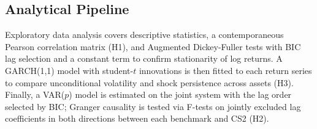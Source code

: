 \subsection{Analytical Pipeline}

Exploratory data analysis covers descriptive statistics, a contemporaneous
Pearson correlation matrix (H1), and Augmented Dickey-Fuller tests with BIC
lag selection and a constant term to confirm stationarity of log returns. A
GARCH(1,1) model with student-$t$ innovations is then fitted to each return
series to compare unconditional volatility and shock persistence across assets
(H3). Finally, a VAR($p$) model is estimated on the joint system with the lag
order selected by BIC; Granger causality is tested via F-tests on jointly
excluded lag coefficients in both directions between each benchmark and CS2
(H2).
